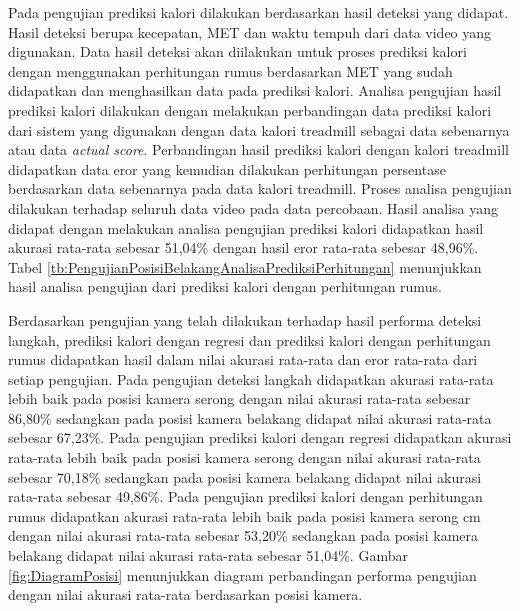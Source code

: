 Pada pengujian prediksi kalori dilakukan berdasarkan hasil deteksi yang didapat. Hasil deteksi berupa kecepatan, MET dan waktu tempuh dari data video yang digunakan. Data hasil deteksi akan diilakukan untuk proses prediksi kalori dengan menggunakan perhitungan rumus berdasarkan MET yang sudah didapatkan dan menghasilkan data pada prediksi kalori. Analisa pengujian hasil prediksi kalori dilakukan dengan melakukan perbandingan data prediksi kalori dari sistem yang digunakan dengan data kalori treadmill sebagai data sebenarnya atau data \emph{actual score}. Perbandingan hasil prediksi kalori dengan kalori treadmill didapatkan data eror yang kemudian dilakukan perhitungan persentase berdasarkan data sebenarnya pada data kalori treadmill. Proses analisa pengujian dilakukan terhadap seluruh data video pada data percobaan. Hasil analisa yang didapat dengan melakukan analisa pengujian prediksi kalori didapatkan hasil akurasi rata-rata sebesar 51,04\% dengan hasil eror rata-rata sebesar 48,96\%. Tabel \ref{tb:PengujianPosisiBelakangAnalisaPrediksiPerhitungan} menunjukkan hasil analisa pengujian dari prediksi kalori dengan perhitungan rumus.

Berdasarkan pengujian yang telah dilakukan terhadap hasil performa deteksi langkah, prediksi kalori dengan regresi dan prediksi kalori dengan perhitungan rumus didapatkan hasil dalam nilai akurasi rata-rata dan eror rata-rata dari setiap pengujian. Pada pengujian deteksi langkah didapatkan akurasi rata-rata lebih baik pada posisi kamera serong dengan nilai akurasi rata-rata sebesar 86,80\% sedangkan pada posisi kamera belakang didapat nilai akurasi rata-rata sebesar 67,23\%. Pada pengujian prediksi kalori dengan regresi didapatkan akurasi rata-rata lebih baik pada posisi kamera serong dengan nilai akurasi rata-rata sebesar 70,18\% sedangkan pada posisi kamera belakang didapat nilai akurasi rata-rata sebesar 49,86\%. Pada pengujian prediksi kalori dengan perhitungan rumus didapatkan akurasi rata-rata lebih baik pada posisi kamera serong cm dengan nilai akurasi rata-rata sebesar 53,20\% sedangkan pada posisi kamera belakang didapat nilai akurasi rata-rata sebesar 51,04\%. Gambar \ref{fig:DiagramPosisi} menunjukkan diagram perbandingan performa pengujian dengan nilai akurasi rata-rata berdasarkan posisi kamera.

